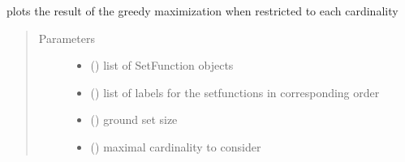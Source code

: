 \documentclass[letterpaper,10pt,english]{sphinxmanual}
\begin{document}
\begin{fulllineitems}
\label{\detokenize{setFTs:setFTs.plotting.plot_max_greedy}}
\sphinxAtStartPar
plots the result of the greedy maximization when restricted to each cardinality
\begin{quote}\begin{description}
\item[{Parameters}] \leavevmode\begin{itemize}
\item {} 
\sphinxAtStartPar
{} (\sphinxstyleliteralemphasis{\sphinxupquote{{[}}}\sphinxstyleliteralemphasis{\sphinxupquote{{]}}}) \textendash{} list of SetFunction objects

\item {} 
\sphinxAtStartPar
{} (\sphinxstyleliteralemphasis{\sphinxupquote{{[}}}\sphinxstyleliteralemphasis{\sphinxupquote{{]}}}) \textendash{} list of labels for the setfunctions in corresponding order

\item {} 
\sphinxAtStartPar
{} () \textendash{} ground set size

\item {} 
\sphinxAtStartPar
{} () \textendash{} maximal cardinality to consider

\end{itemize}

\end{description}\end{quote}

\end{fulllineitems}

\end{document}
